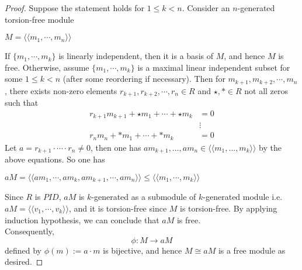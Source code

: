 \documentclass[11pt,openany]{book}
\theoremstyle{plain}
\theoremstyle{definition}
\theoremstyle{remark}
\begin{document}
\begin{proof}
    Suppose the statement holds for $1\leq k< n$. Consider an $n$-generated torsion-free module 
    \begin{center}
        $M=\langle\langle m_1,\cdots,m_n\rangle\rangle$
    \end{center}
    If $\{m_1,\cdots,m_k\}$ is linearly independent, then it is a basis of $M$, and hence $M$ is free. Otherwise, assume $\{m_1,\cdots,m_k\}$ is a maximal linear independent subset for some $1\leq k < n$ (after some reordering if necessary).
    Then for $m_{k+1},m_{k+2},\cdots,m_{n}$, there exists non-zero elements $r_{k+1},r_{k+2}, \cdots, r_{n}\in R$ and $\star, \ast \in R$ not all zeros such that
    \begin{align*}
        r_{k+1}m_{k+1}+{\star}m_1+\cdots +{\star}m_{k} &=0 \\
         &\vdots \\
        r_nm_n+ {\ast }m_1+\cdots + {\ast }m_{k} &=0
    \end{align*}
    Let $a=r_{k+1}\cdot\cdots\cdot r_n\neq0$, then one has $am_{k+1}, \dots, am_n \in \langle \langle m_1, \dots, m_k \rangle \rangle$ by the above equations. So one has
    \begin{center}
        $aM = \langle\langle am_1,\cdots, am_k, am_{k+1},\cdots, am_n\rangle\rangle\leq\langle\langle m_1,\cdots,m_k\rangle\rangle$
    \end{center}
    Since $R$ is $PID$, $aM$ is $k$-generated as a submodule of $k$-generated module i.e. $aM =\langle\langle v_1,\cdots,v_k\rangle\rangle$, and it is torsion-free since $M$ is torsion-free. By applying induction hypothesis, we can conclude that $aM$ is free.\\
    Consequently, 
    $$\phi: M \to aM$$
    defined by $\phi(m) := a\cdot m$ is bijective, and hence $M \cong aM$ is a free module as desired.
\end{proof}
\end{document}
